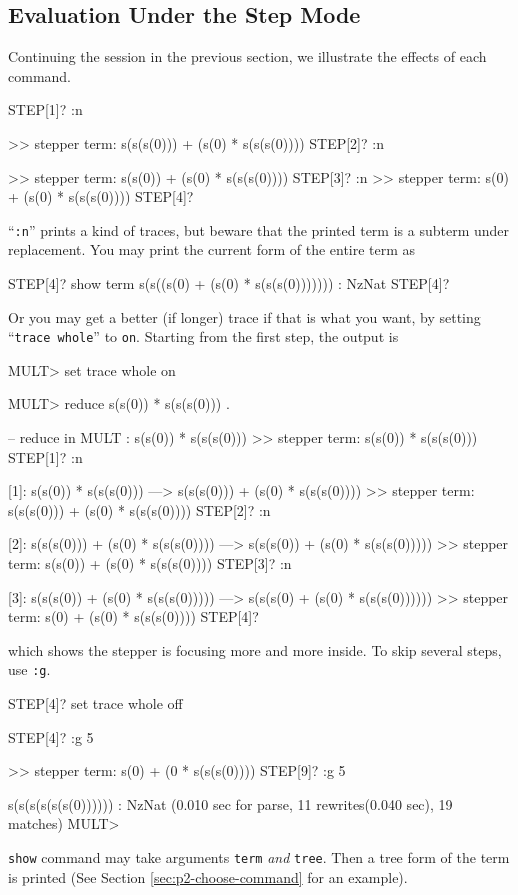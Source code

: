 \documentclass[a4paper]{memoir}
\begin{document}
\subsection{Evaluation Under the Step Mode}\label{sec:p2-eval-step-mode}

Continuing the session in the previous section, we illustrate the
effects of each command.
\begin{vvtm}
\begin{ccode}
  STEP[1]? :n

  >> stepper term: s(s(s(0))) + (s(0) * s(s(s(0))))
  STEP[2]? :n

  >> stepper term: s(s(0)) + (s(0) * s(s(s(0))))
  STEP[3]? :n
  >> stepper term: s(0) + (s(0) * s(s(s(0))))
  STEP[4]? 
\end{ccode}
\end{vvtm}
``\verb|:n|'' prints a kind of traces, but beware that the printed term
is a subterm under replacement. You may print the current form of
the entire term as
\begin{vvtm}
\begin{ccode}
  STEP[4]? show term
  s(s((s(0) + (s(0) * s(s(s(0))))))) : NzNat
  STEP[4]? 
\end{ccode}
\end{vvtm}
Or you may get a better (if longer) trace if
that is what you want, by setting ``\verb|trace whole|'' to \verb|on|.
Starting from the first step, the output is
\begin{vvtm}
\begin{ccode}
  MULT> set trace whole on

  MULT> reduce s(s(0)) * s(s(s(0))) .

  -- reduce in MULT : s(s(0)) * s(s(s(0)))
  >> stepper term: s(s(0)) * s(s(s(0)))
  STEP[1]? :n

  [1]: s(s(0)) * s(s(s(0)))
   ---> s(s(s(0))) + (s(0) * s(s(s(0))))
  >> stepper term: s(s(s(0))) + (s(0) * s(s(s(0))))
  STEP[2]? :n

  [2]: s(s(s(0))) + (s(0) * s(s(s(0))))
   ---> s(s(s(0)) + (s(0) * s(s(s(0)))))
  >> stepper term: s(s(0)) + (s(0) * s(s(s(0))))
  STEP[3]? :n

  [3]: s(s(s(0)) + (s(0) * s(s(s(0)))))
   ---> s(s(s(0) + (s(0) * s(s(s(0))))))
  >> stepper term: s(0) + (s(0) * s(s(s(0))))
  STEP[4]? 
\end{ccode}
\end{vvtm}
which shows the stepper is focusing more and more inside. To skip
several steps, use \verb|:g|.
\begin{vvtm}
\begin{ccode}
  STEP[4]? set trace whole off

  STEP[4]? :g 5

  >> stepper term: s(0) + (0 * s(s(s(0))))
  STEP[9]? :g 5

  s(s(s(s(s(s(0)))))) : NzNat
  (0.010 sec for parse, 11 rewrites(0.040 sec), 19 matches)
  MULT> 
\end{ccode}
\end{vvtm}
\verb|show| command may take arguments \verb|term| {\em and} \verb|tree|.
Then a tree form of the term is printed
(See Section \ref{sec:p2-choose-command} for an example).
\end{document}

